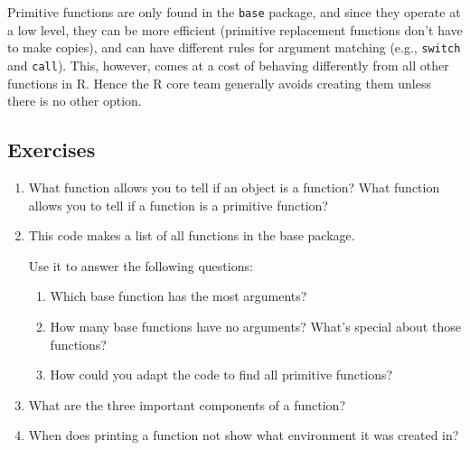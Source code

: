 Primitive functions are only found in the \texttt{base} package, and
since they operate at a low level, they can be more efficient (primitive
replacement functions don't have to make copies), and can have different
rules for argument matching (e.g., \texttt{switch} and \texttt{call}).
This, however, comes at a cost of behaving differently from all other
functions in R. Hence the R core team generally avoids creating them
unless there is no other option.

\subsection{Exercises}

\begin{enumerate}
\def\labelenumi{\arabic{enumi}.}
\item
  What function allows you to tell if an object is a function? What
  function allows you to tell if a function is a primitive function?
\item
  This code makes a list of all functions in the base package.

\begin{Shaded}
\begin{Highlighting}[]
\StringTok{ }\NormalTok{(}\NormalTok{(}\NormalTok{), } \NormalTok{)}
\StringTok{ }
\end{Highlighting}
\end{Shaded}

  Use it to answer the following questions:

  \begin{enumerate}
  \def\labelenumii{\alph{enumii}.}
  \item
    Which base function has the most arguments?
  \item
    How many base functions have no arguments? What's special about
    those functions?
  \item
    How could you adapt the code to find all primitive functions?
  \end{enumerate}
\item
  What are the three important components of a function?
\item
  When does printing a function not show what environment it was created
  in?
\end{enumerate}


